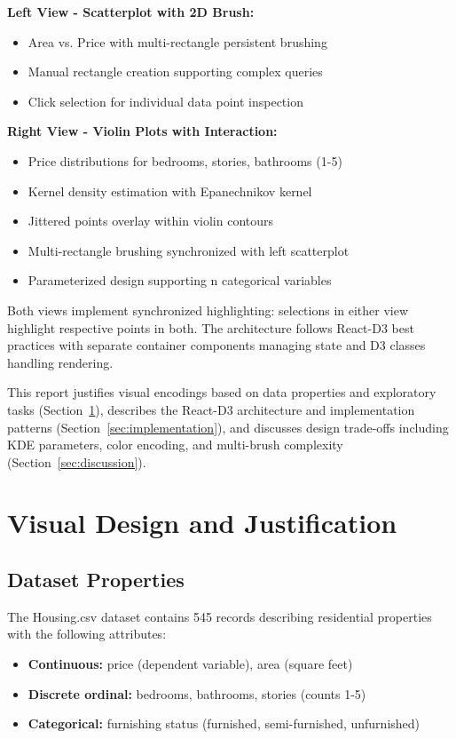 \documentclass[sigplan,screen]{acmart}
\begin{document}
\textbf{Left View - Scatterplot with 2D Brush:}
\begin{itemize}
\item Area vs. Price with multi-rectangle persistent brushing
\item Manual rectangle creation supporting complex queries
\item Click selection for individual data point inspection
\end{itemize}

\textbf{Right View - Violin Plots with Interaction:}
\begin{itemize}
\item Price distributions for bedrooms, stories, bathrooms (1-5)
\item Kernel density estimation with Epanechnikov kernel
\item Jittered points overlay within violin contours
\item Multi-rectangle brushing synchronized with left scatterplot
\item Parameterized design supporting n categorical variables
\end{itemize}

Both views implement synchronized highlighting: selections in either
view highlight respective points in both. The architecture follows React-D3 best
practices with separate container components managing state and D3
classes handling rendering.

This report justifies visual encodings based on data properties and
exploratory tasks (Section~\ref{sec:design}), describes the React-D3
architecture and implementation patterns
(Section~\ref{sec:implementation}), and discusses design trade-offs
including KDE parameters, color encoding, and multi-brush complexity
(Section~\ref{sec:discussion}).

\section{Visual Design and Justification}
\label{sec:design}

\subsection{Dataset Properties}

The Housing.csv dataset contains 545 records describing residential
properties with the following attributes:

\begin{itemize}
\item \textbf{Continuous:} price (dependent variable), area (square
      feet)
\item \textbf{Discrete ordinal:} bedrooms, bathrooms, stories (counts
      1-5)
\item \textbf{Categorical:} furnishing status (furnished,
      semi-furnished, unfurnished)
\end{itemize}
\end{document}
